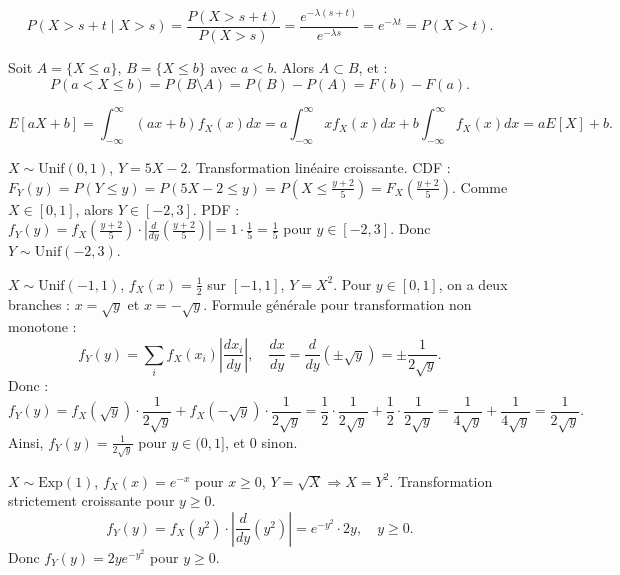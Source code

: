\begin{correctionbox}[Exercice 15 :]
\[
P(X > s+t \mid X > s) = \frac{P(X > s+t)}{P(X > s)} = \frac{e^{-\lambda(s+t)}}{e^{-\lambda s}} = e^{-\lambda t} = P(X > t).
\]
\end{correctionbox}

\begin{correctionbox}[Exercice 16 :]
Soit $A = \{X \le a\}$, $B = \{X \le b\}$ avec $a < b$. Alors $A \subset B$, et :
\[
P(a < X \le b) = P(B \setminus A) = P(B) - P(A) = F(b) - F(a).
\]
\end{correctionbox}

\begin{correctionbox}[Exercice 17 :]
\[
E[aX + b] = \int_{-\infty}^\infty (ax + b) f_X(x) dx = a \int_{-\infty}^\infty x f_X(x) dx + b \int_{-\infty}^\infty f_X(x) dx = aE[X] + b.
\]
\end{correctionbox}

\begin{correctionbox}[Exercice 18 :]
$X \sim \text{Unif}(0,1)$, $Y = 5X - 2$. Transformation linéaire croissante.
CDF : $F_Y(y) = P(Y \le y) = P(5X - 2 \le y) = P\left(X \le \frac{y+2}{5}\right) = F_X\left(\frac{y+2}{5}\right)$.
Comme $X \in [0,1]$, alors $Y \in [-2, 3]$.
PDF : $f_Y(y) = f_X\left(\frac{y+2}{5}\right) \cdot \left|\frac{d}{dy} \left(\frac{y+2}{5}\right)\right| = 1 \cdot \frac{1}{5} = \frac{1}{5}$ pour $y \in [-2, 3]$.
Donc $Y \sim \text{Unif}(-2, 3)$.

\end{correctionbox}

\begin{correctionbox}[Exercice 19 :]
$X \sim \text{Unif}(-1,1)$, $f_X(x) = \frac{1}{2}$ sur $[-1,1]$, $Y = X^2$.
Pour $y \in [0,1]$, on a deux branches : $x = \sqrt{y}$ et $x = -\sqrt{y}$.
Formule générale pour transformation non monotone :
\[
f_Y(y) = \sum_{i} f_X(x_i) \left| \frac{dx_i}{dy} \right|, \quad \frac{dx}{dy} = \frac{d}{dy} (\pm \sqrt{y}) = \pm \frac{1}{2\sqrt{y}}.
\]
Donc :
\[
f_Y(y) = f_X(\sqrt{y}) \cdot \frac{1}{2\sqrt{y}} + f_X(-\sqrt{y}) \cdot \frac{1}{2\sqrt{y}} = \frac{1}{2} \cdot \frac{1}{2\sqrt{y}} + \frac{1}{2} \cdot \frac{1}{2\sqrt{y}} = \frac{1}{4\sqrt{y}} + \frac{1}{4\sqrt{y}} = \frac{1}{2\sqrt{y}}.
\]
Ainsi, $f_Y(y) = \frac{1}{2\sqrt{y}}$ pour $y \in (0,1]$, et $0$ sinon.

\end{correctionbox}

\begin{correctionbox}[Exercice 20 :]
$X \sim \text{Exp}(1)$, $f_X(x) = e^{-x}$ pour $x \ge 0$, $Y = \sqrt{X} \Rightarrow X = Y^2$.
Transformation strictement croissante pour $y \ge 0$.
\[
f_Y(y) = f_X(y^2) \cdot \left| \frac{d}{dy}(y^2) \right| = e^{-y^2} \cdot 2y, \quad y \ge 0.
\]
Donc $f_Y(y) = 2y e^{-y^2}$ pour $y \ge 0$.

\end{correctionbox}
